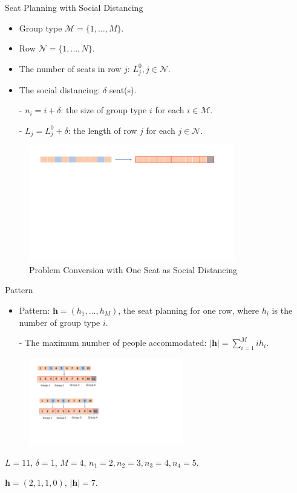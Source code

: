 \begin{frame}{Seat Planning with Social Distancing}
  \begin{itemize}  
    \item Group type $\mathcal{M} = \{1, \ldots, M\}$.
    \item Row $\mathcal{N} = \{1, \ldots, N\}$.
    \item The number of seats in row $j$: $L_j^{0}, j \in \mathcal{N}$.
    \item The social distancing: $\delta$ seat(s).
    \item[-] $n_i = i + \delta$: the size of group type $i$ for each $i \in \mathcal{M}$.
    \item[-] $L_j = L_j^{0} + \delta$: the length of row $j$ for each $j \in \mathcal{N}$.
    \end{itemize}
    
    \begin{figure}[ht]
      \centering
      \includegraphics[width = 0.8\textwidth]{./images/dummy_seat.pdf}
      \caption{Problem Conversion with One Seat as Social Distancing}
  \end{figure}
  \end{frame}

  \begin{frame}{Pattern}
    \begin{itemize}
      \item Pattern: $\bm{h} = (h_1, \ldots, h_M)$, the seat planning for one row, where $h_i$ is the number of group type $i$.

      - The maximum number of people accommodated: $|\bm{h}| = \sum_{i =1}^{M} i h_i$.
    \end{itemize}
    
    \begin{figure}[ht]
      \centering
      \includegraphics[width = 0.6\textwidth]{./images/illustration.pdf}
    \end{figure}
    \centering
    $L = 11$, $\delta =1$, $M =4$, $n_1 = 2, n_2 = 3, n_3 = 4, n_4 = 5$. 

    $\bm{h} = (2, 1, 1, 0)$, $|\bm{h}| = 7$.
  \end{frame}

